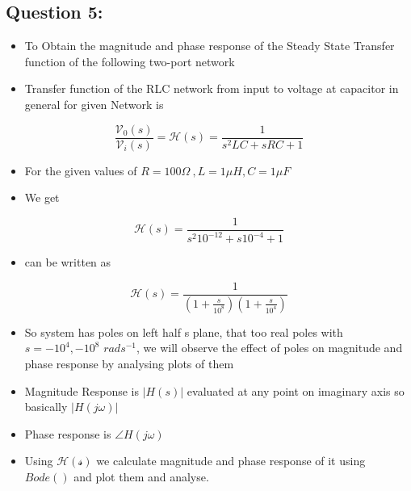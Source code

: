 \documentclass[10pt,a4paper]{article}
\providecommand{\tightlist}{%
      \setlength{\itemsep}{0pt}\setlength{\parskip}{0pt}}
\begin{document}
    \subsection{Question 5:}\label{question-5}

\begin{itemize}
\item
  To Obtain the magnitude and phase response of the Steady State
  Transfer function of the following two-port network
\item
  Transfer function of the RLC network from input to voltage at
  capacitor in general for given Network is
\end{itemize}

\begin{equation}
    \frac{\mathcal{V} _{0}(s)}{\mathcal{V}_{i}(s)} = \mathcal{H}(s) = \frac{1}{s^{2}LC + sRC + 1}
\end{equation}

\begin{itemize}
\item
  For the given values of $ R = 100 \Omega\ , L = 1\mu H,C= 1\mu F$
\item
  We get
\end{itemize}

\begin{equation}
    \mathcal{H}(s) = \frac{1}{s^{2}10^{-12} + s10^{-4} + 1}
\end{equation}

\begin{itemize}
\tightlist
\item
  can be written as
\end{itemize}

\begin{equation}
    \mathcal{H}(s) = \frac{1}{(1 + \frac{s}{10^{8}})(1 + \frac{s}{10^{4}})}
\end{equation}

\begin{itemize}
\item
  So system has poles on left half s plane, that too real poles with $
  s = -10^{4},-10^{8}$ $rads^{-1}$, we will observe the
  effect of poles on magnitude and phase response by analysing plots of
  them
\item
  Magnitude Response is \(|H(s)|\) evaluated at any point on imaginary
  axis so basically \(|H(j\omega)|\)
\item
  Phase response is \(\angle H(j\omega)\)
\item
  Using \(\mathcal{H(s)}\) we calculate magnitude and phase response of
  it using \(Bode()\) and plot them and analyse.
\end{itemize}
\end{document}
